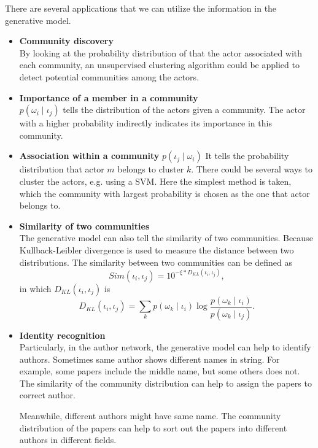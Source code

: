 \documentclass[letterpaper]{article}
\begin{document}
There are several applications that we can utilize the information in the generative model.
\begin{itemize}
\item \textbf{Community discovery} \\
By looking at the probability distribution of that the actor associated with each community, an unsupervised clustering algorithm could be applied to detect potential communities among the actors. 
\item \textbf{Importance of a member in a community} \\
$ p ( \omega_{i}  \mid \iota_{j} ) $ tells the distribution of the actors given a community.
The actor with a higher probability indirectly indicates its importance in this community.
\item \textbf{Association within a community} $ p ( \iota_{j} \mid \omega_{i} ) $
It tells the probability distribution that actor $ m $ belongs to cluster $ k $.
There could be several ways to cluster the actors, e.g. using a SVM.
Here the simplest method is taken, which the community with largest probability is chosen as the one that actor belongs to.
\item \textbf{Similarity of two communities} \\
The generative model can also tell the similarity of two communities.
Because Kullback-Leibler divergence is used to measure the distance between two distributions.
The similarity between two communities can be defined as 
\begin{equation}
Sim ( \iota_{i}, \iota_{j} ) = 10^{ - \xi \ast D_{KL} ( \iota_{i}, \iota_{j} ) },
\end{equation}
in which $ D_{KL} ( \iota_{i}, \iota_{j} ) $ is
\begin{equation}
D_{KL} ( \iota_{i}, \iota_{j} ) = \sum_{k} p( \omega_{k} \mid \iota_{i} ) \log \frac{ p( \omega_{k} \mid \iota_{i} ) }{ p( \omega_{k} \mid \iota_{j} ) }.
\end{equation}
\item \textbf{Identity recognition} \\
Particularly, in the author network, the generative model can help to identify authors.
Sometimes same author shows different names in string. 
For example, some papers include the middle name, but some others does not.
The similarity of the community distribution can help to assign the papers to correct author. 

Meanwhile, different authors might have same name.
The community distribution of the papers can help to sort out the papers into different authors in different fields.
\end{itemize}
\end{document}
